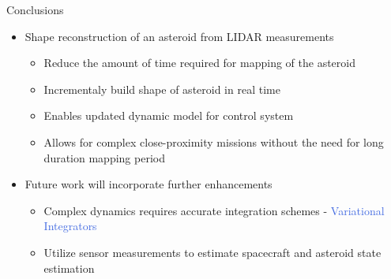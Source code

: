\documentclass[final, usenames, dvipsnames]{beamer}
\newlength{\onecolwidth}
\def\Emph{\textcolor{RoyalBlue}}
\begin{document}
\begin{frame}[t]
\begin{columns}[T,onlytextwidth]
\begin{column}{\onecolwidth}
\begin{block}{Conclusions} %
    \begin{itemize}
        \item Shape reconstruction of an asteroid from LIDAR measurements
            \begin{itemize}
                \item Reduce the amount of time required for mapping of the asteroid
                \item Incrementaly build shape of asteroid in real time
                \item Enables updated dynamic model for control system
                \item Allows for complex close-proximity missions without the need for long duration mapping period
            \end{itemize}
        \item Future work will incorporate further enhancements
            \begin{itemize}
                \item Complex dynamics requires accurate integration schemes - \Emph{Variational Integrators}
                \item Utilize sensor measurements to estimate spacecraft and asteroid state estimation
            \end{itemize}
    \end{itemize}
\end{block} %
\end{column}  %

\end{columns} %
\end{frame} %
\end{document}
